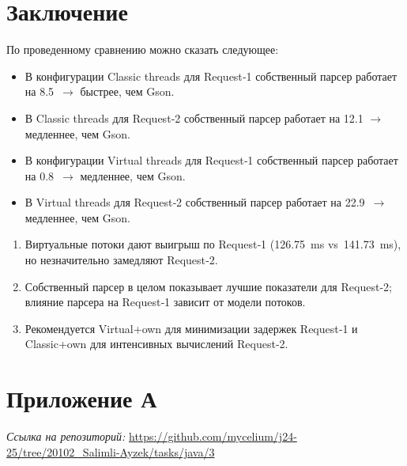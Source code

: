 \documentclass[areasetadvanced]{scrartcl}
\begin{document}
\section*{Заключение}
По проведенному сравнению можно сказать следующее:
\begin{itemize}
    \item В конфигурации Classic threads для Request‑1 собственный парсер работает на 8.5 $\rightarrow$ быстрее, чем Gson.  
    \item В Classic threads для Request‑2 собственный парсер работает на 12.1 $\rightarrow$ медленнее, чем Gson.  
    \item В конфигурации Virtual threads для Request‑1 собственный парсер работает на 0.8 $\rightarrow$ медленнее, чем Gson.  
    \item В Virtual threads для Request‑2 собственный парсер работает на 22.9 $\rightarrow$ медленнее, чем Gson.
\end{itemize}
\begin{enumerate}
  \item Виртуальные потоки дают выигрыш по Request‑1 (126.75 ms vs 141.73 ms), но незначительно замедляют Request‑2.
  \item Собственный парсер в целом показывает лучшие показатели для Request‑2; влияние парсера на Request‑1 зависит от модели потоков.
  \item Рекомендуется Virtual+own для минимизации задержек Request‑1 и Classic+own для интенсивных вычислений Request‑2.
\end{enumerate}
\newpage
\section*{Приложение А}
\emph{Ссылка на репозиторий: }
\url{https://github.com/mycelium/j24-25/tree/20102_Salimli-Ayzek/tasks/java/3}
\end{document}
